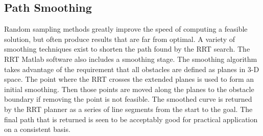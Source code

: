 \subsection{Path Smoothing}
	Random sampling methods greatly improve the speed of computing a feasible solution, but often produce results that are far from optimal.  A variety of smoothing techniques exist to shorten the path found by the RRT search.  The RRT Matlab software also includes a smoothing stage.  The smoothing algorithm takes advantage of the requirement that all obstacles are defined as planes in 3-D space.  The point where the RRT crosses the extended planes is used to form an initial smoothing.  Then those points are moved along the planes to the obstacle boundary if removing the point is not feasible.
	The smoothed curve is returned by the RRT planner as a series of line segments from the start to the goal.  The final path that is returned is seen to be acceptably good for practical application on a consistent basis.